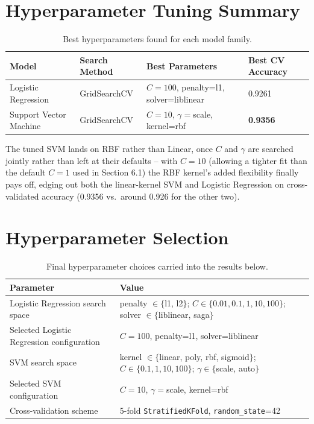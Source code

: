 \documentclass[11pt,a4paper]{article}
\begin{document}
\section{Hyperparameter Tuning Summary}
\begin{table}[h]
\centering
\small
\begin{tabular}{@{}llll@{}}
\toprule
Model & Search Method & Best Parameters & Best CV Accuracy \\
\midrule
Logistic Regression & GridSearchCV & $C{=}100$, penalty=l1, solver=liblinear & 0.9261 \\
Support Vector Machine & GridSearchCV & $C{=}10$, $\gamma{=}$scale, kernel=rbf & \textbf{0.9356} \\
\bottomrule
\end{tabular}
\caption{Best hyperparameters found for each model family.}
\end{table}
The tuned SVM lands on RBF rather than Linear, once $C$ and $\gamma$ are searched jointly rather than left at their defaults -- with $C=10$ (allowing a tighter fit than the default $C=1$ used in Section 6.1) the RBF kernel's added flexibility finally pays off, edging out both the linear-kernel SVM and Logistic Regression on cross-validated accuracy (0.9356 vs.\ around 0.926 for the other two).

\section{Hyperparameter Selection}
\begin{table}[h]
\centering
\begin{tabular}{@{}p{4.3cm}p{8.5cm}@{}}
\toprule
Parameter & Value \\
\midrule
Logistic Regression search space & penalty $\in \{$l1, l2$\}$; $C \in \{0.01,0.1,1,10,100\}$; solver $\in \{$liblinear, saga$\}$ \\
Selected Logistic Regression configuration & $C{=}100$, penalty=l1, solver=liblinear \\
SVM search space & kernel $\in \{$linear, poly, rbf, sigmoid$\}$; $C \in \{0.1,1,10,100\}$; $\gamma \in \{$scale, auto$\}$ \\
Selected SVM configuration & $C{=}10$, $\gamma{=}$scale, kernel=rbf \\
Cross-validation scheme & 5-fold \texttt{StratifiedKFold}, \texttt{random\_state}=42 \\
\bottomrule
\end{tabular}
\caption{Final hyperparameter choices carried into the results below.}
\end{table}
\end{document}

